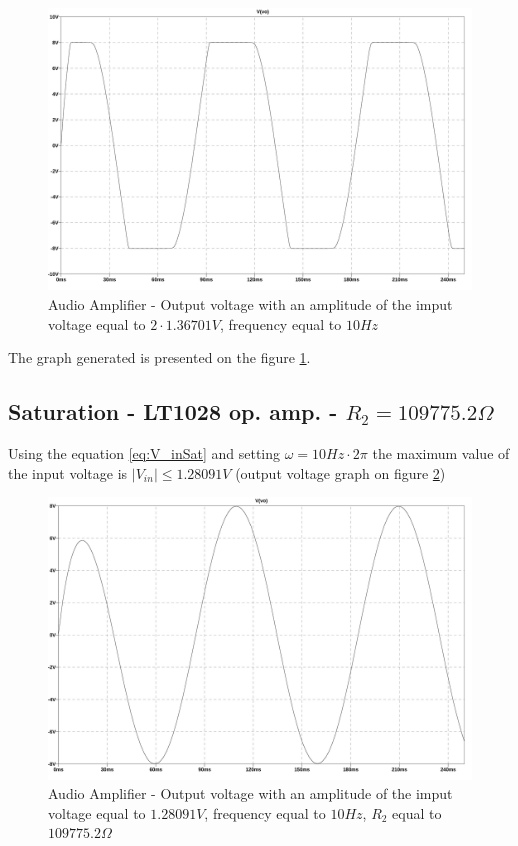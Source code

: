 \documentclass[10pt,a4paper]{article}
\begin{document}
\begin{figure}[H]
  \centering
  \includegraphics[width=14cm]{graph/1d4c.jpg}
  \caption{Audio Amplifier - Output voltage with an amplitude of the imput voltage equal to $2 \cdot 1.36701V$, frequency equal to $10Hz$}
  \label{1d4cgraph}
\end{figure}

The graph generated is presented on the figure \ref{1d4cgraph}.\\

\subsection{Saturation - LT1028 op. amp. - $R_2 = 109775.2\Omega$}
Using the equation \ref{eq:V_inSat} and setting $\omega = 10Hz \cdot 2\pi$ the maximum value of the input voltage is $|V_{in}| \leq 1.28091V$ (output voltage graph on figure \ref{1d5graph})

\begin{figure}[H]
  \centering
  \includegraphics[width=14cm]{graph/1d5.jpg}
  \caption{Audio Amplifier - Output voltage with an amplitude of the imput voltage equal to $1.28091V$, frequency equal to $10Hz$, $R_2$ equal to $109775.2\Omega$}
  \label{1d5graph}
\end{figure}
\end{document}
